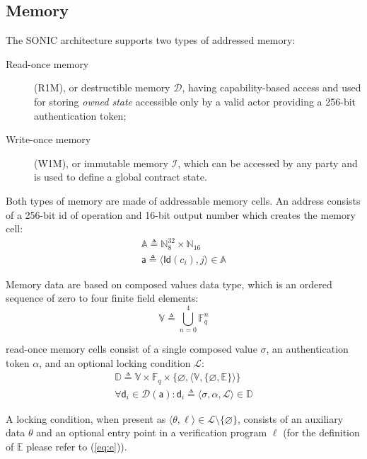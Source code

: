 \documentclass[9pt,oneside]{amsart}
\begin{document}
\begin{multicols}{2}
\subsection{Memory}\label{Memory}

The SONIC architecture supports two types of addressed memory:
\begin{description}
\item[Read-once memory] (R1M), or \gls{destructible memory} $\mathcal{D}$,
    having capability-based access and used for storing \emph{owned state}
    accessible only by a valid actor providing a 256-bit \gls{authentication token};

\item[Write-once memory] (W1M), or \gls{immutable memory} $\mathcal{I}$,
    which can be accessed by any party and is used to define a global contract state.
\end{description}

Both types of memory are made of addressable memory cells.
An address consists of a 256-bit id of operation and 16-bit output number
which creates the memory cell:
\noindent
\begin{gather}
\mathbb{A} \triangleq \mathbb{N}^{32}_8 \times \mathbb{N}_{16} \\
\mathsf{a} \triangleq \langle \mathsf{Id}(c_i), j \rangle \in \mathbb{A}
\end{gather}

Memory data are based on \glspl{composed value} data type,
which is an ordered sequence of zero to four finite field elements:
\noindent
\begin{equation}
\mathbb{V} \triangleq \bigcup_{n=0}^{4} \mathbb{F}_q^n
\end{equation}

\Gls{read-once memory} cells consist of a single \gls{composed value} $\sigma$,
an \gls{authentication token} $\alpha$, and an optional \gls{locking condition} $\mathcal{L}$:
\noindent
\begin{gather}
\mathbb{D} \triangleq \mathbb{V} \times \mathbb{F}_q \times \{ \varnothing, \langle \mathbb{V}, \{ \varnothing, \mathbb{E} \} \rangle \} \\
\forall \mathsf{d}_i \in \mathcal{D}(\mathsf{a}) : \mathsf{d}_i \triangleq \langle \sigma, \alpha, \mathcal{L} \rangle \in \mathbb{D}
\end{gather}

A locking condition, when present as $\langle \theta, \ell \rangle \in \mathcal{L} \setminus \{ \varnothing \}$,
consists of an auxiliary data $\theta$ and an optional entry point in a verification program $\ell$
(for the definition of $\mathbb{E}$ please refer to (\ref{eq:e})).


\end{multicols}
\end{document}
